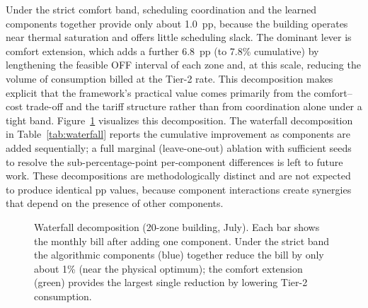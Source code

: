 \documentclass[12pt,a4paper]{article}
\begin{document}
Under the strict comfort band, scheduling coordination and the learned components together provide only about 1.0~pp, because the building operates near thermal saturation and offers little scheduling slack. The dominant lever is comfort extension, which adds a further 6.8~pp (to 7.8\% cumulative) by lengthening the feasible OFF interval of each zone and, at this scale, reducing the volume of consumption billed at the Tier-2 rate. This decomposition makes explicit that the framework's practical value comes primarily from the comfort--cost trade-off and the tariff structure rather than from coordination alone under a tight band. Figure~\ref{fig:waterfall} visualizes this decomposition. The waterfall decomposition in Table~\ref{tab:waterfall} reports the cumulative improvement as components are added sequentially; a full marginal (leave-one-out) ablation with sufficient seeds to resolve the sub-percentage-point per-component differences is left to future work. These decompositions are methodologically distinct and are not expected to produce identical pp values, because component interactions create synergies that depend on the presence of other components.

\begin{figure}[H]
\centering
{}
\caption{Waterfall decomposition (20-zone building, July). Each bar shows the monthly bill after adding one component. Under the strict band the algorithmic components (blue) together reduce the bill by only about 1\% (near the physical optimum); the comfort extension (green) provides the largest single reduction by lowering Tier-2 consumption.}
\label{fig:waterfall}
\end{figure}
\end{document}
